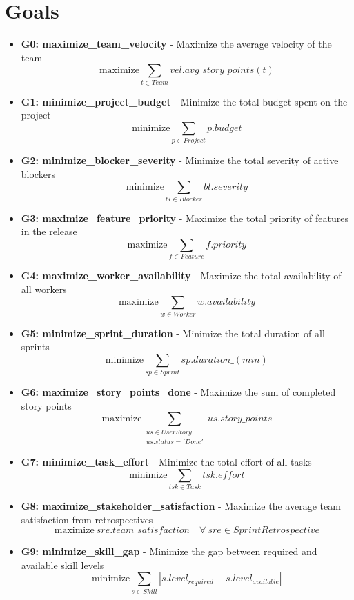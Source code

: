 \documentclass{article}
\begin{document}
\section{Goals}
\begin{itemize}
    \item \textbf{G0: maximize\_team\_velocity} - Maximize the average velocity of the team
          \[ \text{maximize} \sum_{t \in Team} vel.avg\_story\_points(t) \]
    \item \textbf{G1: minimize\_project\_budget} - Minimize the total budget spent on the project
          \[ \text{minimize} \sum_{p \in Project} p.budget \]
    \item \textbf{G2: minimize\_blocker\_severity} - Minimize the total severity of active blockers
          \[ \text{minimize} \sum_{bl \in Blocker} bl.severity \]
    \item \textbf{G3: maximize\_feature\_priority} - Maximize the total priority of features in the release
          \[ \text{maximize} \sum_{f \in Feature} f.priority \]
    \item \textbf{G4: maximize\_worker\_availability} - Maximize the total availability of all workers
          \[ \text{maximize} \sum_{w \in Worker} w.availability \]
    \item \textbf{G5: minimize\_sprint\_duration} - Minimize the total duration of all sprints
          \[ \text{minimize} \sum_{sp \in Sprint} sp.duration\_(min) \]
    \item \textbf{G6: maximize\_story\_points\_done} - Maximize the sum of completed story points
          \[ \text{maximize} \sum_{\substack{us \in UserStory \\ us.status = 'Done'}} us.story\_points \]
    \item \textbf{G7: minimize\_task\_effort} - Minimize the total effort of all tasks
          \[ \text{minimize} \sum_{tsk \in Task} tsk.effort \]
    \item \textbf{G8: maximize\_stakeholder\_satisfaction} - Maximize the average team satisfaction from retrospectives
          \[ \text{maximize}\ sre.team\_satisfaction \quad \forall\ sre \in SprintRetrospective \]
    \item \textbf{G9: minimize\_skill\_gap} - Minimize the gap between required and available skill levels
          \[ \text{minimize} \sum_{s \in Skill} |s.level_{required} - s.level_{available}| \]
\end{itemize}
\end{document}
